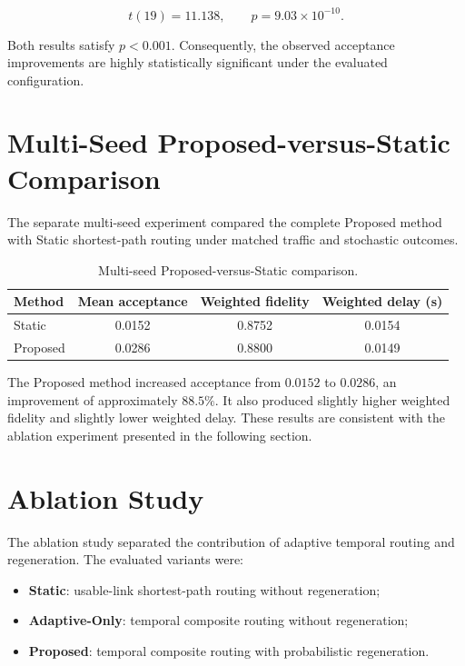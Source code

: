 \begin{equation}
t(19)=11.138,
\qquad
p=9.03\times10^{-10}.
\end{equation}

Both results satisfy \(p<0.001\). Consequently, the observed acceptance
improvements are highly statistically significant under the evaluated
configuration.

\section{Multi-Seed Proposed-versus-Static Comparison}

The separate multi-seed experiment compared the complete Proposed method with
Static shortest-path routing under matched traffic and stochastic outcomes.

\begin{table}[htbp]
\centering
\caption{Multi-seed Proposed-versus-Static comparison.}
\label{tab:multi_seed_corrected}
\begin{tabular}{lccc}
\hline
Method &
Mean acceptance &
Weighted fidelity &
Weighted delay (s) \\
\hline
Static &
0.0152 &
0.8752 &
0.0154 \\
Proposed &
0.0286 &
0.8800 &
0.0149 \\
\hline
\end{tabular}
\end{table}

The Proposed method increased acceptance from \(0.0152\) to \(0.0286\), an
improvement of approximately \(88.5\%\). It also produced slightly higher
weighted fidelity and slightly lower weighted delay. These results are
consistent with the ablation experiment presented in the following section.

\section{Ablation Study}

The ablation study separated the contribution of adaptive temporal routing and
regeneration. The evaluated variants were:

\begin{itemize}
    \item \textbf{Static}: usable-link shortest-path routing without regeneration;
    \item \textbf{Adaptive-Only}: temporal composite routing without regeneration;
    \item \textbf{Proposed}: temporal composite routing with probabilistic regeneration.
\end{itemize}

